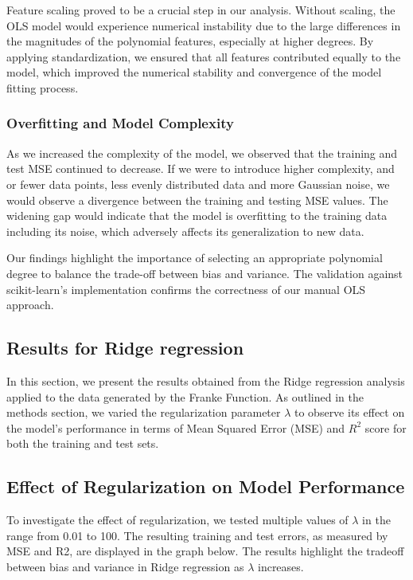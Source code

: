 \documentclass{article}
\begin{document}
\begin{enumerate}
Feature scaling proved to be a crucial step in our analysis. Without scaling, the OLS model would experience numerical instability due to the large differences in the magnitudes of the polynomial features, especially at higher degrees. By applying standardization, we ensured that all features contributed equally to the model, which improved the numerical stability and convergence of the model fitting process.

\subsubsection{Overfitting and Model Complexity}

As we increased the complexity of the model, we observed that the training and test MSE continued to decrease. If we were to introduce higher complexity, and or fewer data points, less evenly distributed data and more Gaussian noise, we would observe a divergence between the training and testing MSE values. The widening gap would indicate that the model is overfitting to the training data including its noise, which adversely affects its generalization to new data. 
\newline

Our findings highlight the importance of selecting an appropriate polynomial degree to balance the trade-off between bias and variance. The validation against scikit-learn's implementation confirms the correctness of our manual OLS approach.



\subsection{Results for Ridge regression}

In this section, we present the results obtained from the Ridge regression analysis applied to the data generated by the Franke Function. As outlined in the methods section, we varied the regularization parameter \( \lambda \) to observe its effect on the model's performance in terms of Mean Squared Error (MSE) and \(R^2\) score for both the training and test sets.

\subsection{Effect of Regularization on Model Performance}

To investigate the effect of regularization, we tested multiple values of \( \lambda \) in the range from 0.01 to 100. The resulting training and test errors, as measured by MSE and R2, are displayed in the graph below. The results highlight the tradeoff between bias and variance in Ridge regression as \( \lambda \) increases.



\end{enumerate}
\end{document}

